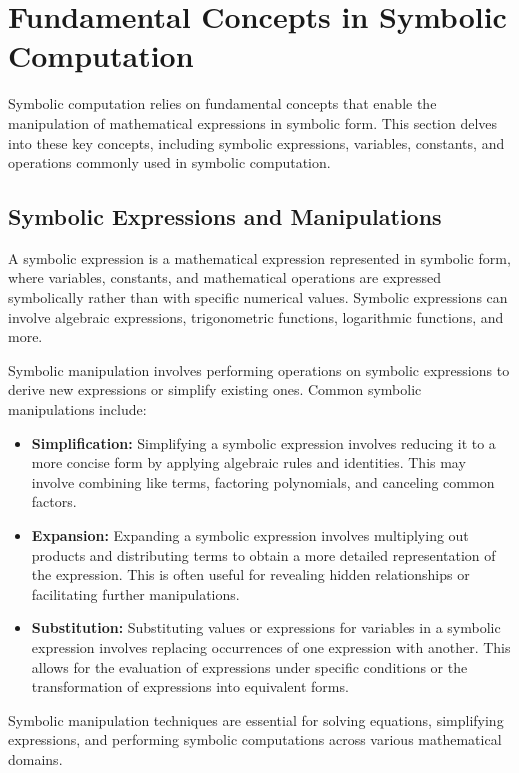
\section{Fundamental Concepts in Symbolic Computation}
\label{chap2:sec:concepts}

Symbolic computation relies on fundamental concepts that enable the manipulation of mathematical expressions in symbolic form. This section delves into these key concepts, including symbolic expressions, variables, constants, and operations commonly used in symbolic computation.

\subsection{Symbolic Expressions and Manipulations}

A symbolic expression is a mathematical expression represented in symbolic form, where variables, constants, and mathematical operations are expressed symbolically rather than with specific numerical values. Symbolic expressions can involve algebraic expressions, trigonometric functions, logarithmic functions, and more.

Symbolic manipulation involves performing operations on symbolic expressions to derive new expressions or simplify existing ones. Common symbolic manipulations include:
%
\begin{itemize}
  \setlength{\itemsep}{0.0em}
  \item \textbf{Simplification:} Simplifying a symbolic expression involves reducing it to a more concise form by applying algebraic rules and identities. This may involve combining like terms, factoring polynomials, and canceling common factors.
  \item \textbf{Expansion:} Expanding a symbolic expression involves multiplying out products and distributing terms to obtain a more detailed representation of the expression. This is often useful for revealing hidden relationships or facilitating further manipulations.
  \item \textbf{Substitution:} Substituting values or expressions for variables in a symbolic expression involves replacing occurrences of one expression with another. This allows for the evaluation of expressions under specific conditions or the transformation of expressions into equivalent forms.
\end{itemize}
%
Symbolic manipulation techniques are essential for solving equations, simplifying expressions, and performing symbolic computations across various mathematical domains.


